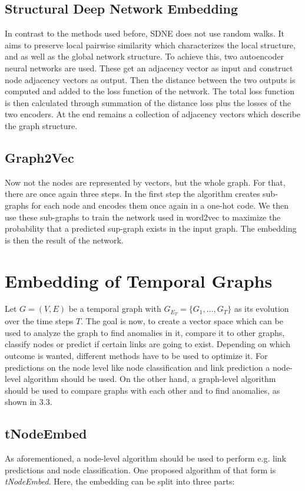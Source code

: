 \documentclass[sigconf]{acmart}
\begin{document}
\subsection{Structural Deep Network Embedding}
In contrast to the methods used before, SDNE does not use random walks. It aims to preserve local pairwise similarity which characterizes the local structure, and 
as well as the global network structure.
To achieve this, two autoencoder neural networks are used. These get an adjacency vector as input and construct node adjacency vectors as output.
Then the distance between the two outputs is computed and added to the loss function of the network.
The total loss function is then calculated through summation of the distance loss plus the losses of the two encoders.
At the end remains a collection of adjacency vectors which describe the graph structure.
\cite{Godec.31.12.2018}


\subsection{Graph2Vec}
Now not the nodes are represented by vectors, but the whole graph. For that, there are once again three steps. 
In the first step the algorithm creates sub-graphs for each node and encodes them once again in a one-hot code. We then use these sub-graphs to train the network used in 
word2vec to maximize the probability that a predicted sup-graph exists in the input graph. The embedding is then the result of the network.
\cite{Godec.31.12.2018}



\section{Embedding of Temporal Graphs}
Let \(G = (V,E)\) be a temporal graph with \(G_{E_T} = \{G_1, \ldots, G_T\}\) as its evolution over the time steps \(T\).
The goal is now, to create a vector space which can be used to analyze the graph to find anomalies in it, compare it to other graphs, classify nodes or predict if 
certain links are going to exist.
Depending on which outcome is wanted, different methods have to be used to optimize it. For predictions on the node level like node classification and link prediction a node-level algorithm should be used. 
On the other hand, a graph-level algorithm should be used to compare graphs with each other and to find anomalies, as shown in 3.3.

\subsection{tNodeEmbed}
As aforementioned, a node-level algorithm should be used to perform e.g. link predictions and node classification. 
One proposed algorithm of that form is \emph{tNodeEmbed}. Here, the embedding can be split into three parts: 
\end{document}
